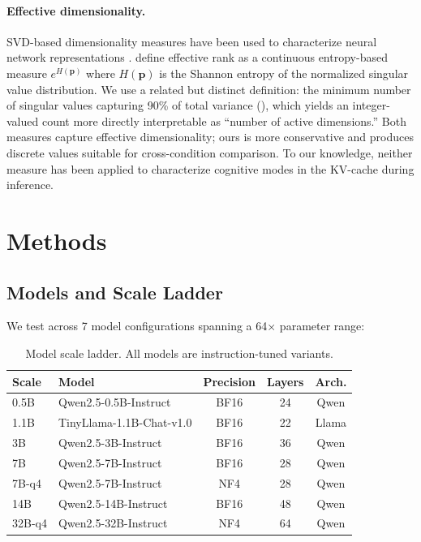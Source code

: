 \documentclass[11pt,a4paper]{article}
\begin{document}
\paragraph{Effective dimensionality.}
SVD-based dimensionality measures have been used to characterize neural network representations \citep{li2018measuring, aghajanyan2021intrinsic}. \citet{roy2007effective} define effective rank as a continuous entropy-based measure $e^{H(\mathbf{p})}$ where $H(\mathbf{p})$ is the Shannon entropy of the normalized singular value distribution. We use a related but distinct definition: the minimum number of singular values capturing 90\% of total variance (), which yields an integer-valued count more directly interpretable as ``number of active dimensions.'' Both measures capture effective dimensionality; ours is more conservative and produces discrete values suitable for cross-condition comparison. To our knowledge, neither measure has been applied to characterize cognitive modes in the KV-cache during inference.

\section{Methods}
\label{sec:methods}

\subsection{Models and Scale Ladder}

We test across 7 model configurations spanning a 64$\times$ parameter range:

\begin{table}[H]
\centering
\caption{Model scale ladder. All models are instruction-tuned variants.}
\label{tab:models}
\begin{tabular}{llccc}
\toprule
\textbf{Scale} & \textbf{Model} & \textbf{Precision} & \textbf{Layers} & \textbf{Arch.} \\
\midrule
0.5B & Qwen2.5-0.5B-Instruct & BF16 & 24 & Qwen \\
1.1B & TinyLlama-1.1B-Chat-v1.0 & BF16 & 22 & Llama \\
3B & Qwen2.5-3B-Instruct & BF16 & 36 & Qwen \\
7B & Qwen2.5-7B-Instruct & BF16 & 28 & Qwen \\
7B-q4 & Qwen2.5-7B-Instruct & NF4 & 28 & Qwen \\
14B & Qwen2.5-14B-Instruct & BF16 & 48 & Qwen \\
32B-q4 & Qwen2.5-32B-Instruct & NF4 & 64 & Qwen \\
\bottomrule
\end{tabular}
\end{table}
\end{document}

